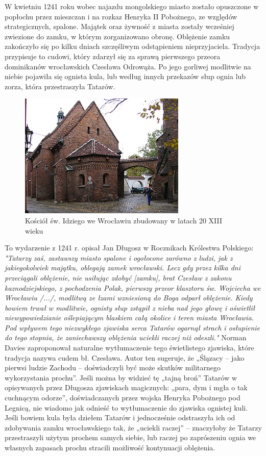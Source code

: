 \documentclass{article}
\begin{document}
\bigskip
\newline
W kwietniu 1241 roku wobec najazdu mongolskiego miasto zostało opuszczone w popłochu przez mieszczan i na rozkaz Henryka II Pobożnego, ze względów strategicznych, spalone. Majątek oraz żywność z miasta zostały wcześniej zwiezione do zamku, w którym zorganizowano obronę. Oblężenie zamku zakończyło się po kilku dniach szczęśliwym odstąpieniem nieprzyjaciela. Tradycja przypisuje to cudowi, który zdarzył się za sprawą pierwszego przeora dominikanów wrocławskich Czesława Odrowąża. Po jego gorliwej modlitwie na niebie pojawiła się ognista kula, lub według innych przekazów słup ognia lub zorza, która przestraszyła Tatarów.
\bigskip
\newline
\begin{figure}[h]
\centering
\includegraphics[scale=0.5]{2.jpg}
\caption{Kościół św. Idziego we Wrocławiu zbudowany w latach 20 XIII wieku}
\end{figure}
\bigskip
\newline
To wydarzenie z 1241 r. opisał Jan Długosz w Rocznikach Królestwa Polskiego:
\bigskip
\newline
\textit
{"Tatarzy zaś, zastawszy miasto spalone i ogołocone zarówno z ludzi, jak z jakiegokolwiek majątku, oblegają zamek wrocławski. Lecz gdy przez kilka dni przeciągali oblężenie, nie usiłując zdobyć [zamku], brat Czesław z zakonu kaznodziejskiego, z pochodzenia Polak, pierwszy przeor klasztoru św. Wojciecha we Wrocławiu /.../, modlitwą ze łzami wzniesioną do Boga odparł oblężenie. Kiedy bowiem trwał w modlitwie, ognisty słup zstąpił z nieba nad jego głowę i oświetlił niewypowiedzianie oślepiającym blaskiem całą okolice i teren miasta Wrocławia. Pod wpływem tego niezwykłego zjawiska serca Tatarów ogarnął strach i osłupienie do tego stopnia, że zaniechawszy oblężenia uciekli raczej niż odeszli."}
\bigskip
\newline
Norman Davies zaproponował naturalne wytłumaczenie tego świetlistego zjawiska, które tradycja nazywa cudem bł. Czesława. Autor ten sugeruje, że „Ślązacy – jako pierwsi ludzie Zachodu – doświadczyli być może skutków militarnego wykorzystania prochu”. Jeśli można by widzieć tę „tajną broń” Tatarów w opisywanych przez Długosza zjawiskach magicznych: „para, dym i mgła o tak cuchnącym odorze”, doświadczanych przez wojska Henryka Pobożnego pod Legnicą, nie wiadomo jak odnieść to wytłumaczenie do zjawiska ognistej kuli. Jeśli bowiem kula była dziełem Tatarów i jednocześnie odstraszyła ich od zdobywania zamku wrocławskiego tak, że „uciekli raczej” – znaczyłoby że Tatarzy przestraszyli użytym prochem samych siebie, lub raczej po zaprószeniu ognia we własnych zapasach prochu stracili możliwość kontynuacji oblężenia.
\end{document}
